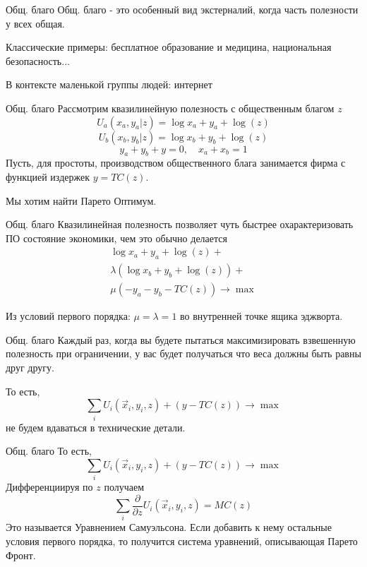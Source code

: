 \documentclass{beamer}
\begin{document}
\begin{frame}{Общ. благо}
Общ. благо - это особенный вид экстерналий, когда часть полезности у всех общая. 

Классические примеры: бесплатное образование и медицина, национальная безопасность...

В контексте маленькой группы людей: интернет
\end{frame}

\begin{frame}{Общ. благо}
Рассмотрим квазилинейную полезность с общественным благом $z$
$$ U_a(x_a,y_a|z) = \log x_a + y_a + \log(z)$$
$$ U_b(x_b,y_b|z) = \log x_b + y_b + \log(z)$$
$$ y_a + y_b + y = 0, \quad x_a + x_b = 1$$
Пусть, для простоты, производством общественного блага занимается фирма с функцией издержек $y = TC(z)$. 

Мы хотим найти Парето Оптимум.
\end{frame}

\begin{frame}{Общ. благо}
Квазилинейная полезность позволяет чуть быстрее охарактеризовать ПО состояние экономики, чем это обычно делается 
\begin{gather*} \log x_a + y_a + \log(z) + \\ \lambda (\log x_b + y_b + \log(z)) + \\ \mu (-y_a - y_b - TC(z)) \to \max \end{gather*}

Из условий первого порядка: $\mu = \lambda = 1$ во внутренней точке ящика эджворта.
\end{frame}

\begin{frame}{Общ. благо}
Каждый раз, когда вы будете пытаться максимизировать взвешенную полезность при ограничении, у вас будет получаться что веса должны быть равны друг другу.

То есть,
$$ \sum_i U_i(\vec x_i, y_i, z) + (y - TC(z)) \to \max$$
не будем вдаваться в технические детали.
\end{frame}

\begin{frame}{Общ. благо}
То есть,
$$ \sum_i U_i(\vec x_i, y_i, z) + (y - TC(z)) \to \max$$
Дифференциируя по $z$ получаем
$$ \sum_i \frac{\partial}{\partial z}U_i(\vec x_i, y_i, z) = MC(z)$$
Это называется \alert{Уравнением Самуэльсона}. Если добавить к нему остальные условия первого порядка, то получится система уравнений, описывающая Парето Фронт.
\end{frame}
\end{document}
